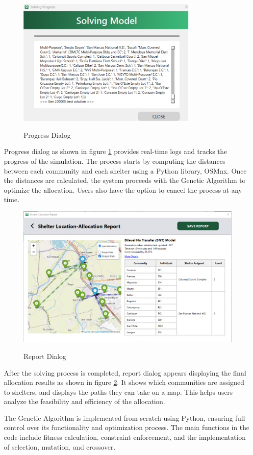 	\begin{figure}[h!]
		\caption{Progress Dialog}
		\centering
		\includegraphics[width=3.5in]{Chapter 4/progress}
		\label{solveProg}
	\end{figure}
	Progress dialog as shown in figure \ref{solveProg} provides real-time logs and tracks the progress of the simulation. The process starts by computing the distances between each community and each shelter using a Python library, OSMnx. Once the distances are calculated, the system proceeds with the Genetic Algorithm to optimize the allocation. Users also have the option to cancel the process at any time.
	
	\begin{figure}[h!]
		\caption{Report Dialog}
		\centering
		\includegraphics[width=4.5in]{Chapter 4/alloc report}
		\label{shelAllocRep}
	\end{figure}
	After the solving process is completed, report dialog appears displaying the final allocation results as shown in figure \ref{shelAllocRep}. It shows which communities are assigned to shelters, and displays the paths they can take on a map. This helps users analyze the feasibility and efficiency of the allocation.
	
	The Genetic Algorithm is implemented from scratch using Python, ensuring full control over its functionality and optimization process. The main functions in the code include fitness calculation, constraint enforcement, and the implementation of selection, mutation, and crossover.
	
